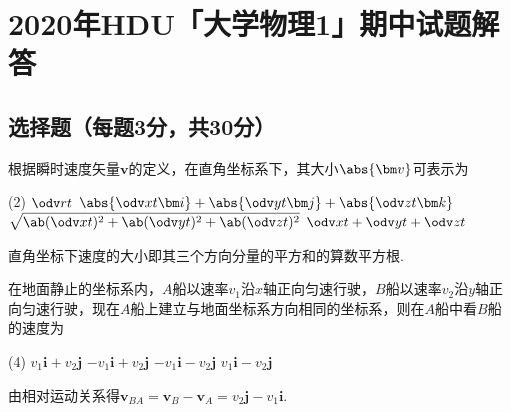 \chapter*{2020年\textsf{HDU}「大学物理1」期中试题解答}



\section{选择题（每题3分，共30分）}

\begin{problem}
    根据瞬时速度矢量$\bm v$的定义，在直角坐标系下，其大小$\abs{\bm v}$可表示为
    \begin{tasks}(2)
        \task $\displaystyle\odv rt$
        \task $\displaystyle\abs{\odv xt\bm i}+\abs{\odv yt\bm j}+\abs{\odv zt\bm k}$
        \task[\true] $\displaystyle\sqrt{\ab(\odv xt)^2+\ab(\odv yt)^2+\ab(\odv zt)^2}$
        \task $\displaystyle\odv xt+\odv yt+\odv zt$
    \end{tasks}
\end{problem}
\begin{solution}
    直角坐标下速度的大小即其三个方向分量的平方和的算数平方根.
\end{solution}

\begin{problem}
    在地面静止的坐标系内，$A$船以速率$v_1$沿$x$轴正向匀速行驶，$B$船以速率$v_2$沿$y$轴正向匀速行驶，现在$A$船上建立与地面坐标系方向相同的坐标系，则在$A$船中看$B$船的速度为
    \begin{tasks}(4)
        \task $v_1\bm i+v_2\bm j$
        \task[\true] $-v_1\bm i+v_2\bm j$
        \task $-v_1\bm i-v_2\bm j$
        \task $v_1\bm i-v_2\bm j$
    \end{tasks}
\end{problem}
\begin{solution}
    由相对运动关系得$\bm v_{BA}=\bm v_B-\bm v_A=v_2\bm j-v_1\bm i$.
\end{solution}

